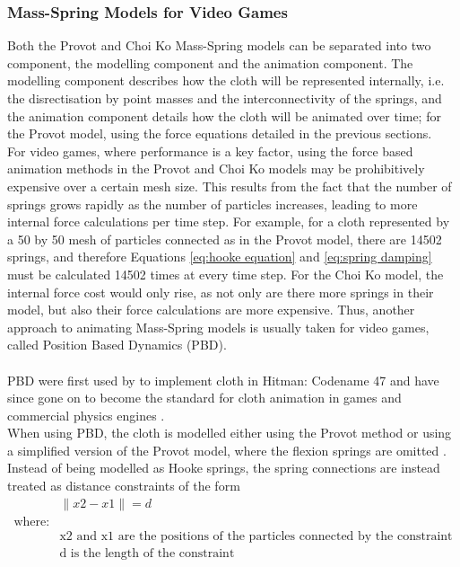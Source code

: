 \subsubsection{Mass-Spring Models for Video Games}
Both the Provot and Choi Ko Mass-Spring models can be separated into two component, the modelling component and the animation component. The modelling component describes how the cloth will be represented internally, i.e. the disrectisation by point masses and the interconnectivity of the springs, and the animation component details how the cloth will be animated over time; for the Provot model, using the force equations detailed in the previous sections. 
\\For video games, where performance is a key factor, using the force based animation methods in the Provot and Choi Ko models may be prohibitively expensive over a certain mesh size. This results from the fact that the number of springs grows rapidly as the number of particles increases, leading to more internal force calculations per time step. For example, for a cloth represented by a 50 by 50 mesh of particles connected as in the Provot model, there are 14502 springs, and therefore Equations \ref{eq:hooke equation} and \ref{eq:spring damping} must be calculated 14502 times at every time step. For the Choi Ko model, the internal force cost would only rise, as not only are there more springs in their model, but also their force calculations are more expensive. Thus, another approach to animating Mass-Spring models is usually taken for video games, called Position Based Dynamics (PBD).
\\\\PBD were first used by \textcite{Jakobsen2005} to implement cloth in Hitman: Codename 47 and have since gone on to become the standard for cloth animation in games \parencite[2]{Enqvist2010} and commercial physics engines \parencite{Kim2011}.
\\When using PBD, the cloth is modelled either using the Provot method \parencite[2]{Enqvist2010} or using a simplified version of the Provot model, where the flexion springs are omitted \parencites[7]{Zeller2005}[25]{Kim2011}. Instead of being modelled as Hooke springs, the spring connections are instead treated as distance constraints of the form
\begin{equation}
\begin{split}
\label{eq:distance constraint}
  &\parallel x2 - x1 \parallel = d
\\  \text{where:}
  \\&\text{x2 and x1 are the positions of the particles connected by the constraint}
  \\&\text{d is the length of the constraint}
\end{split}
\end{equation}
